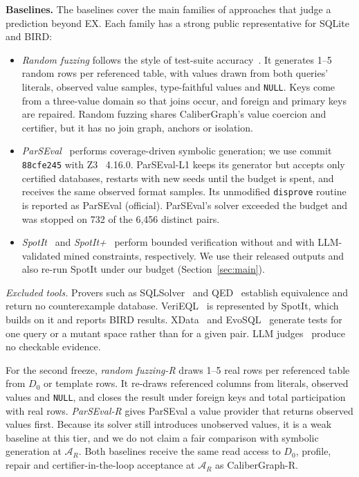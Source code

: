 \textbf{Baselines.} The baselines cover the main families of approaches that judge a prediction beyond EX. Each family has a strong public representative for SQLite and BIRD:
\begin{itemize}
\item \emph{Random fuzzing} follows the style of test-suite accuracy~\cite{zhong2020testsuite}. It generates 1--5 random rows per referenced table, with values drawn from both queries' literals, observed value samples, type-faithful values and \texttt{NULL}. Keys come from a three-value domain so that joins occur, and foreign and primary keys are repaired. Random fuzzing shares CaliberGraph's value coercion and certifier, but it has no join graph, anchors or isolation.
\item \emph{ParSEval}~\cite{chen2025parseval} performs coverage-driven symbolic generation; we use commit \texttt{88cfe245} with Z3~\cite{demoura2008z3} 4.16.0. ParSEval-L1 keeps its generator but accepts only certified databases, restarts with new seeds until the budget is spent, and receives the same observed format samples. Its unmodified \texttt{disprove} routine is reported as ParSEval (official). ParSEval's solver exceeded the budget and was stopped on 732 of the 6,456 distinct pairs.
\item \emph{SpotIt}~\cite{klopfenstein2026spotit} and \emph{SpotIt+}~\cite{tremante2026spotitplus} perform bounded verification without and with LLM-validated mined constraints, respectively. We use their released outputs and also re-run SpotIt under our budget (Section~\ref{sec:main}).
\end{itemize}
\emph{Excluded tools.} Provers such as SQLSolver~\cite{ding2023sqlsolver} and QED~\cite{wang2024qed} establish equivalence and return no counterexample database. VeriEQL~\cite{he2024verieql} is represented by SpotIt, which builds on it and reports BIRD results. XData~\cite{chandra2015xdata} and EvoSQL~\cite{castelein2018evosql} generate tests for one query or a mutant space rather than for a given pair. LLM judges~\cite{kim2025flex} produce no checkable evidence.

For the second freeze, \emph{random fuzzing-R} draws 1--5 real rows per referenced table from $D_0$ or template rows. It re-draws referenced columns from literals, observed values and \texttt{NULL}, and closes the result under foreign keys and total participation with real rows. \emph{ParSEval-R} gives ParSEval a value provider that returns observed values first. Because its solver still introduces unobserved values, it is a weak baseline at this tier, and we do not claim a fair comparison with symbolic generation at $\mathcal A_R$. Both baselines receive the same read access to $D_0$, profile, repair and certifier-in-the-loop acceptance at $\mathcal A_R$ as CaliberGraph-R.

